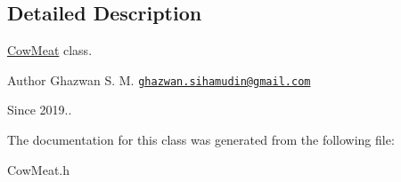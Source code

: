\subsection{Detailed Description}
\hyperlink{classCowMeat}{Cow\+Meat} class.

\begin{DoxyAuthor}{Author}
Ghazwan S. M. \href{mailto:ghazwan.sihamudin@gmail.com}{\tt ghazwan.\+sihamudin@gmail.\+com} 
\end{DoxyAuthor}
\begin{DoxySince}{Since}
2019.. 
\end{DoxySince}


The documentation for this class was generated from the following file\+:\begin{DoxyCompactItemize}
\item 
Cow\+Meat.\+h\end{DoxyCompactItemize}
